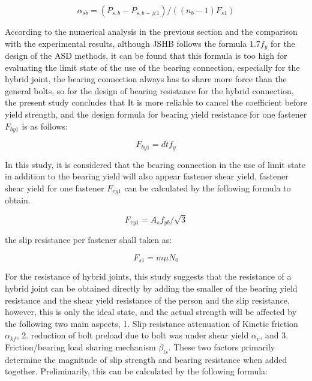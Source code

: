 \begin{equation} \label{eq-asb}
    \alpha_{sb}=(P_{s,b}-P_{s,b-\#1})/((n_b-1) F_{s1})
\end{equation}







According to the numerical analysis in the previous section and the comparison with the experimental results, although JSHB follows the formula $1.7f_y$ for the design of the \ac{ASD} methods, it can be found that this formula is too high for evaluating the limit state of the use of the bearing connection, especially for the hybrid joint, the bearing connection always has to share more force than the general bolts, so for the design of bearing resistance for the hybrid connection, the present study concludes that It is more reliable to cancel the coefficient before yield strength, and the design formula for bearing yield resistance for one fastener $F_{by1}$ is as follows:

\begin{equation}
    F_{by1} = dtf_y
\end{equation}

In this study, it is considered that the bearing connection in the use of limit state in addition to the bearing yield will also appear fastener shear yield, fastener shear yield for one fastener $F_{vy1}$ can be calculated by the following formula to obtain.

\begin{equation}
    F_{vy1} = A_s f_{yb}/\sqrt{3}
\end{equation}

the slip resistance per fastener shall taken as:

\begin{equation}
    F_{s1} = m \mu N_0
\end{equation}


For the resistance of hybrid joints, this study suggests that the resistance of a hybrid joint can be obtained directly by adding the smaller of the bearing yield resistance and the shear yield resistance of the person and the slip resistance, however, this is only the ideal state, and the actual strength will be affected by the following two main aspects, 1. Slip resistance attenuation of Kinetic friction $\alpha_{kf}$, 2. reduction of bolt preload due to bolt was under shear yield $\alpha_{v}$, and 3. Friction/bearing load sharing mechanism $\beta_{ls}$. These two factors primarily determine the magnitude of slip strength and bearing resistance when added together. Preliminarily, this can be calculated by the following formula:

